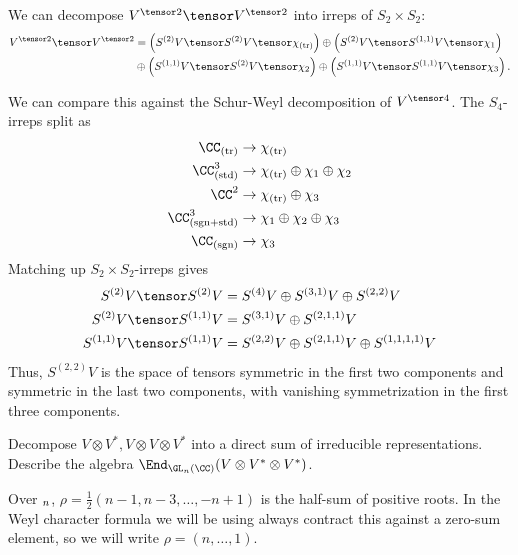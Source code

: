 \documentclass[11pt, headheight=30pt]{scrartcl}
\begin{document}
We can decompose $V^{\tensor 2} \tensor V^{\tensor 2}$ into irreps of $S_2 \times S_2$:
\begin{align*}
    V^{\tensor 2} \tensor V^{\tensor 2} &= \left(S^{(2)}V \tensor S^{(2)}V \tensor \chi_{\text{(tr)}}\right) \oplus \left(S^{(2)}V \tensor S^{(1,1)}V \tensor \chi_1 \right) \\
    &\oplus \left(S^{(1,1)}V \tensor S^{(2)}V \tensor \chi_2 \right) \oplus \left(S^{(1,1)}V \tensor S^{(1,1)}V \tensor \chi_{3}\right).
\end{align*}

We can compare this against the Schur-Weyl decomposition of $V^{\tensor 4}$. The $S_4$-irreps split as
\begin{align*}
    \CC_{\text{(tr)}} &\to \chi_{\text{(tr)}} \\
    \CC^3_{\text{(std)}} &\to \chi_{\text{(tr)}} \oplus \chi_1 \oplus \chi_2 \\
    \CC^2_{} &\to \chi_{\text{(tr)}} \oplus \chi_3 \\
    \CC^3_{\text{(sgn+std)}} &\to \chi_1 \oplus \chi_2 \oplus \chi_3 \\
    \CC_{\text{(sgn)}} &\to \chi_3
\end{align*}
Matching up $S_2 \times S_2$-irreps gives 
\begin{align*}
    S^{(2)}V \tensor S^{(2)}V &= S^{(4)}V \oplus S^{(3,1)}V \oplus S^{(2,2)}V \\
    S^{(2)}V \tensor S^{(1,1)}V &= S^{(3,1)}V \oplus S^{(2,1,1)}V \\
    S^{(1,1)}V \tensor S^{(1,1)}V &= S^{(2,2)}V \oplus S^{(2,1,1)}V \oplus S^{(1,1,1,1)}V
\end{align*}
Thus, $S^{(2,2)}V$ is the space of tensors symmetric in the first two components and symmetric in the last two components, with vanishing symmetrization in the first three components.

\begin{prob}
    Decompose $V \otimes V^*, V \otimes V \otimes V^*$ into a direct sum of irreducible representations. Describe the algebra $\End_{\GL_n(\CC)}(V \otimes V^* \otimes V^*)$.
\end{prob}

Over $\sl_n$, $\rho = \frac12(n-1, n-3, \dots, -n+1)$ is the half-sum of positive roots. In the Weyl character formula we will be using always contract this against a zero-sum element, so we will write $\rho = (n,\dots, 1)$.
\end{document}
